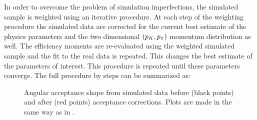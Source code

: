 In order to overcome the problem of simulation imperfections, the simulated sample is weighted using an iterative procedure.
At each step of the weighting procedure the simulated data are corrected for the current best estimate of the physics
parameters and the two dimensional $(p_{K},p_{\pi})$ momentum distribution as well.
The efficiency moments are re-evaluated using the weighted simulated sample and the fit to the real data is repeated.
This changes the best estimate of the parameters of interest. This procedure is repeated until these parameters
converge. The full procedure by steps can be summarized as:

\begin{figure}[!t]
  \centering
  \begin{subfigure}{0.49\textwidth}
    \raggedright
    \scalebox{1.15}{}
    \caption{}
    \label{angAccCor_ctk}
  \end{subfigure}%
  \hfill%
  \begin{subfigure}{0.49\textwidth}
    \raggedleft
    \scalebox{1.15}{}
    \caption{}
    \label{angAccCorr_ctl}
  \end{subfigure}
  \vspace*{0.02\textwidth}
  \begin{subfigure}{0.49\textwidth}
    \raggedright
    \scalebox{1.15}{}
    \caption{}
    \label{angAccCorr_phi}
  \end{subfigure}
  \caption{Angular acceptance shape from simulated data before (black points) and after (red points) acceptance corrections.
           Plots are made in the same way as in .}
  \label{angAggCorrections}
\end{figure}


